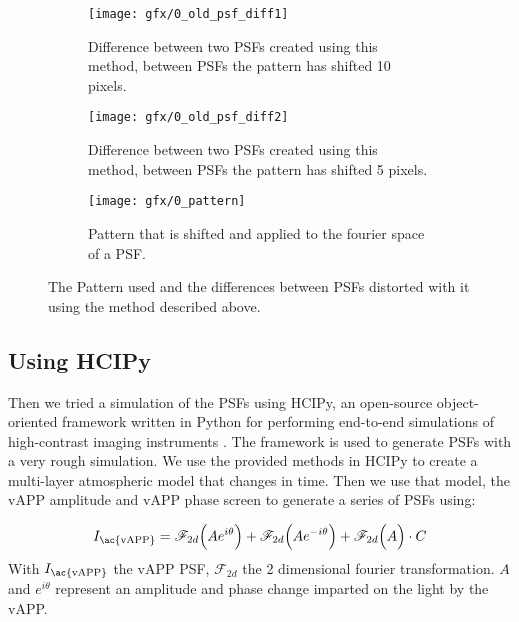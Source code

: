 \begin{figure}[h!]
      \begin{subfigure}[t]{0.5\textwidth}
        \texttt{[image: gfx/0\_old\_psf\_diff1]}
        \caption{Difference between two \acp{PSF}  created using this method, between \acp{PSF} the pattern has shifted 10 pixels.}
      \end{subfigure}%
      \begin{subfigure}[t]{0.5\textwidth}
        \texttt{[image: gfx/0\_old\_psf\_diff2]}
        \caption{Difference between two \acp{PSF}  created using this method, between \acp{PSF} the pattern has shifted 5 pixels.}
      \end{subfigure}
      
      \begin{subfigure}[]{0.5\textwidth}
        \texttt{[image: gfx/0\_pattern]}
        \caption{Pattern that is shifted and applied to the fourier space of a \ac{PSF}.}
      \end{subfigure}
      
  \caption{The Pattern used and the differences between \acp{PSF} distorted with it using the method described above.}
  \label{fig:patterns}
\end{figure}

\subsection{Using HCIPy}
\label{sec:hcipy}
Then we tried a simulation of the  \acp{PSF} using \ac{HCIPy}, an open-source object-oriented framework written in Python for performing end-to-end simulations of high-contrast imaging instruments \cite{hcipy}. The framework is used to generate \acp{PSF} with a very rough simulation. We use the provided methods in \ac{HCIPy} to create a multi-layer atmospheric model that changes in time. Then we use that model, the \ac{vAPP} amplitude and \ac{vAPP} phase screen to generate a series of \acp{PSF} using:

\begin{equation}
I_\text{\ac{vAPP}} = \mathscr{F}_{2d}\Big( Ae^{i\theta}\Big) + \mathscr{F}_{2d}\Big( Ae^{-i\theta}\Big) + \mathscr{F}_{2d}\Big( A \Big) \cdot C
\end{equation}
With $I_\text{\ac{vAPP}}$ the \ac{vAPP} \ac{PSF}, $\mathscr{F}_{2d}$ the 2 dimensional fourier transformation. $A$ and $e^{i\theta}$ represent an amplitude and phase change imparted on the light by the \ac{vAPP}.\\

